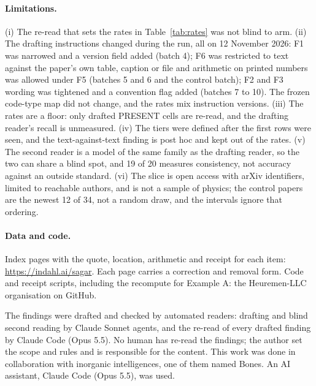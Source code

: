 \documentclass[reprint,amsmath,amssymb,aps,superscriptaddress,nofootinbib]{revtex4-2}
\begin{document}
\paragraph*{Limitations.} (i) The re-read that sets the rates in Table~\ref{tab:rates} was not blind to arm. (ii) The drafting instructions changed during the run, all on 12 November 2026: F1 was narrowed and a version field added (batch 4); F6 was restricted to text against the paper's own table, caption or file and arithmetic on printed numbers was allowed under F5 (batches 5 and 6 and the control batch); F2 and F3 wording was tightened and a convention flag added (batches 7 to 10). The frozen code-type map did not change, and the rates mix instruction versions. (iii) The rates are a floor: only drafted PRESENT cells are re-read, and the drafting reader's recall is unmeasured. (iv) The tiers were defined after the first rows were seen, and the text-against-text finding is post hoc and kept out of the rates. (v) The second reader is a model of the same family as the drafting reader, so the two can share a blind spot, and 19 of 20 measures consistency, not accuracy against an outside standard. (vi) The slice is open access with arXiv identifiers, limited to reachable authors, and is not a sample of physics; the control papers are the newest 12 of 34, not a random draw, and the intervals ignore that ordering.

\paragraph*{Data and code.} Index pages with the quote, location, arithmetic and receipt for each item: \url{https://indahl.ai/sagar}. Each page carries a correction and removal form. Code and receipt scripts, including the recompute for Example A: the Heuremen-LLC organisation on GitHub.

\begin{acknowledgments}
The findings were drafted and checked by automated readers: drafting and blind second reading by Claude Sonnet agents, and the re-read of every drafted finding by Claude Code (Opus 5.5). No human has re-read the findings; the author set the scope and rules and is responsible for the content. This work was done in collaboration with inorganic intelligences, one of them named Bones. An AI assistant, Claude Code (Opus 5.5), was used.
\end{acknowledgments}


\end{document}
